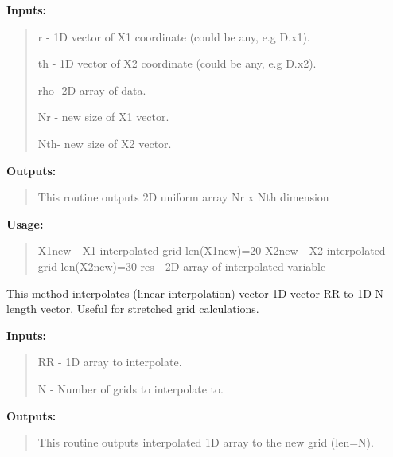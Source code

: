 \documentclass[letterpaper,10pt,english]{sphinxmanual}
\begin{document}
\begin{fulllineitems}
\begin{fulllineitems}
\textbf{Inputs:}
\begin{quote}

r  - 1D vector of X1 coordinate (could be any, e.g D.x1).

th - 1D vector of X2 coordinate (could be any, e.g D.x2).

rho- 2D array of data.

Nr - new size of X1 vector.

Nth- new size of X2 vector.
\end{quote}

\textbf{Outputs:}
\begin{quote}

This routine outputs 2D uniform array Nr x Nth dimension
\end{quote}

\textbf{Usage:}
\begin{quote}






X1new - X1 interpolated grid len(X1new)=20
X2new - X2 interpolated grid len(X2new)=30
res   - 2D array of interpolated variable
\end{quote}

\end{fulllineitems}


\begin{fulllineitems}
\label{tools:pyPLUTO.Tools.myInterpol}
This method interpolates (linear interpolation) vector 1D vector RR to 1D N-length vector. Useful for stretched grid calculations.

\textbf{Inputs:}
\begin{quote}

RR - 1D array to interpolate.

N  - Number of grids to interpolate to.
\end{quote}

\textbf{Outputs:}
\begin{quote}

This routine outputs interpolated 1D array to the new grid (len=N).
\end{quote}


\end{fulllineitems}
\end{fulllineitems}
\end{document}
